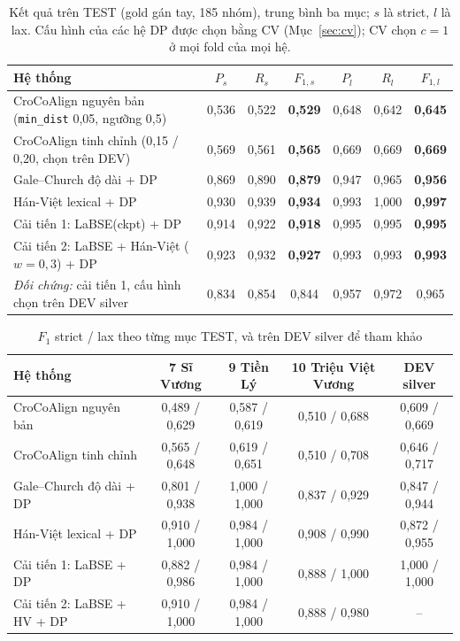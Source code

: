 \documentclass[11pt,a4paper]{article}
\newcommand{\code}[1]{\texttt{#1}}
\newcommand{\B}[1]{\textbf{#1}}
\newcommand{\croco}{CroCoAlign}
\begin{document}
\begin{table}[h]\centering\small
\caption{Kết quả trên TEST (gold gán tay, 185 nhóm), trung bình ba mục; $s$ là strict, $l$ là lax. Cấu hình của các
hệ DP được chọn bằng CV (Mục~\ref{sec:cv}); CV chọn $c=1$ ở mọi fold của mọi hệ.}\label{tab:main}
\begin{tabular}{lcccccc}
\toprule
\B{Hệ thống} & $P_{s}$ & $R_{s}$ & \B{$F_{1,s}$} & $P_{l}$ & $R_{l}$ & \B{$F_{1,l}$}\\
\midrule
\croco{} nguyên bản (\code{min\_dist} 0,05, ngưỡng 0,5) & 0,536 & 0,522 & \B{0,529} & 0,648 & 0,642 & \B{0,645}\\
\croco{} tinh chỉnh (0,15 / 0,20, chọn trên DEV)      & 0,569 & 0,561 & \B{0,565} & 0,669 & 0,669 & \B{0,669}\\
Gale--Church độ dài + DP                              & 0,869 & 0,890 & \B{0,879} & 0,947 & 0,965 & \B{0,956}\\
Hán-Việt lexical + DP                                 & 0,930 & 0,939 & \B{0,934} & 0,993 & 1,000 & \B{0,997}\\
Cải tiến 1: LaBSE(ckpt) + DP                          & 0,914 & 0,922 & \B{0,918} & 0,995 & 0,995 & \B{0,995}\\
Cải tiến 2: LaBSE + Hán-Việt ($w=0{,}3$) + DP         & 0,923 & 0,932 & \B{0,927} & 0,993 & 0,993 & \B{0,993}\\
\midrule
\emph{Đối chứng:} cải tiến 1, cấu hình chọn trên DEV silver & 0,834 & 0,854 & 0,844 & 0,957 & 0,972 & 0,965\\
\bottomrule
\end{tabular}
\end{table}

\begin{table}[h]\centering\small
\caption{$F_1$ strict / lax theo từng mục TEST, và trên DEV silver để tham khảo}\label{tab:perfile}
\begin{tabular}{lcccc}
\toprule
\B{Hệ thống} & \B{7 Sĩ Vương} & \B{9 Tiền Lý} & \B{10 Triệu Việt Vương} & \B{DEV silver}\\
\midrule
\croco{} nguyên bản          & 0,489 / 0,629 & 0,587 / 0,619 & 0,510 / 0,688 & 0,609 / 0,669\\
\croco{} tinh chỉnh          & 0,565 / 0,648 & 0,619 / 0,651 & 0,510 / 0,708 & 0,646 / 0,717\\
Gale--Church độ dài + DP     & 0,801 / 0,938 & 1,000 / 1,000 & 0,837 / 0,929 & 0,847 / 0,944\\
Hán-Việt lexical + DP        & 0,910 / 1,000 & 0,984 / 1,000 & 0,908 / 0,990 & 0,872 / 0,955\\
Cải tiến 1: LaBSE + DP       & 0,882 / 0,986 & 0,984 / 1,000 & 0,888 / 1,000 & 1,000 / 1,000\\
Cải tiến 2: LaBSE + HV + DP  & 0,910 / 1,000 & 0,984 / 1,000 & 0,888 / 0,980 & --\\
\bottomrule
\end{tabular}
\end{table}
\end{document}
